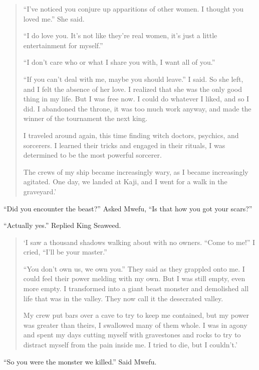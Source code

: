 \begin{quote}
``I've noticed you conjure up apparitions of other women. I thought you loved me.'' She said.

``I do love you. It's not like they're real women, it's just a little entertainment for myself.''

``I don't care who or what I share you with, I want all of you.''

``If you can't deal with me, maybe you should leave.'' I said.
So she left, and I felt the absence of her love.
I realized that she was the only good thing in my life.
But I was free now. I could do whatever I liked, and so I did.
I abandoned the throne, it was too much work anyway, and made the winner of the tournament the next king.

I traveled around again, this time finding witch doctors, psychics, and sorcerers. I learned their tricks and engaged in their rituals, I was determined to be the most powerful sorcerer.

The crews of my ship became increasingly wary, as I became increasingly agitated.
One day, we landed at Ka\-ji, and I went for a walk in the graveyard.'
\end{quote}

``Did you encounter the beast?'' Asked Mwe\-fu, ``Is that how you got your scars?''

``Actually yes.'' Replied King Seaweed.

\begin{quote}
`I saw a thousand shadows walking about with no owners. ``Come to me!'' I cried, ``I'll be your master.''

``You don't own us, we own you.'' They said as they grappled onto me. I could feel their power melding with my own. But I was still empty, even more empty.
I transformed into a giant beast monster and demolished all life that was in the valley.
They now call it the desecrated valley.

My crew put bars over a cave to try to keep me contained, but my power was greater than theirs, I swallowed many of them whole. I was in agony and spent my days cutting myself with gravestones and rocks to try to distract myself from the pain inside me. I tried to die, but I couldn't.'
\end{quote}

``So you were the monster we killed.'' Said Mwe\-fu.

